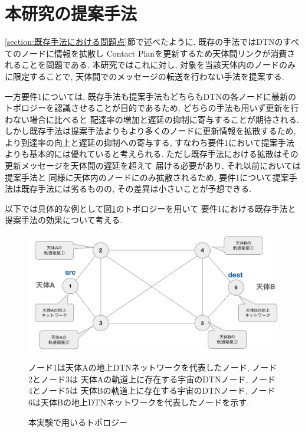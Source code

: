 \section{本研究の提案手法}
\label{section:要件1における既存手法と提案手法の比較}
\ref{section:既存手法における問題点}節で述べたように, 既存の手法ではDTNのすべてのノードに情報を拡散し
Contact Planを更新するため天体間リンクが消費されることを問題である.   
本研究ではこれに対し, 対象を当該天体内のノードのみに限定することで, 天体間でのメッセージの転送を行わない手法を提案する.

一方要件1については, 既存手法も提案手法もどちらもDTNの各ノードに最新の
トポロジーを認識させることが目的であるため,
どちらの手法も用いず更新を行わない場合に比べると
配達率の増加と遅延の抑制に寄与することが期待される.
しかし既存手法は提案手法よりもより多くのノードに更新情報を拡散するため,
より到達率の向上と遅延の抑制への寄与する, 
すなわち要件1において提案手法よりも基本的には優れていると考えられる. 
ただし既存手法における拡散はその更新メッセージを天体間の遅延を超えて
届ける必要があり, それ以前においては提案手法と
同様に天体内のノードにのみ拡散されるため, 
要件1について提案手法は既存手法には劣るものの, その差異は小さいことが予想できる. 

以下では具体的な例として図\ref{fig:experimentation_topology}のトポロジーを用いて
要件1における既存手法と提案手法の効果について考える.

\begin{figure}[tbh]
    \centering
    \includegraphics[width=0.7\textheight]{img/thesis_Sample_topology.pdf}
    \caption{本実験で用いるトポロジー}
    \label{fig:experimentation_topology}
    \begin{minipage}{\textwidth}
        \centering
        \vspace{3mm}
        \fontsize{10.5pt}{12pt}\selectfont
        ノード1は天体Aの地上DTNネットワークを代表したノード, ノード2とノード3は
        天体Aの軌道上に存在する宇宙のDTNノード, ノード4とノード5は
        天体Bの軌道上に存在する宇宙のDTNノード, 
        ノード6は天体Bの地上DTNネットワークを代表したノードを示す. 
    \end{minipage}
\end{figure}

